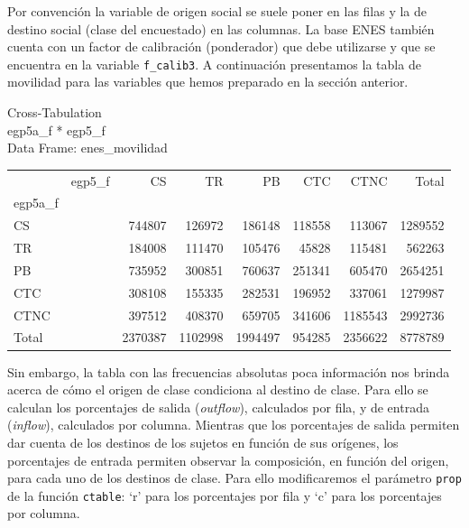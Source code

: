 \documentclass[
]{article}
\newenvironment{Shaded}{\begin{snugshade}}{\end{snugshade}}
\newcommand{\AttributeTok}[1]{\textcolor[rgb]{0.13,0.29,0.53}{#1}}
\newcommand{\FunctionTok}[1]{\textcolor[rgb]{0.13,0.29,0.53}{\textbf{#1}}}
\newcommand{\NormalTok}[1]{#1}
\newcommand{\SpecialCharTok}[1]{\textcolor[rgb]{0.81,0.36,0.00}{\textbf{#1}}}
\newcommand{\StringTok}[1]{\textcolor[rgb]{0.31,0.60,0.02}{#1}}
\begin{document}
Por convención la variable de origen social se suele poner en las filas y la de destino social (clase del encuestado) en las columnas. La base ENES también cuenta con un factor de calibración (ponderador) que debe utilizarse y que se encuentra en la variable \texttt{f\_calib3}. A continuación presentamos la tabla de movilidad para las variables que hemos preparado en la sección anterior.

\begin{Shaded}
\end{Shaded}

Cross-Tabulation\\
egp5a\_f * egp5\_f\\
Data Frame: enes\_movilidad

\begin{longtable}[]{@{}lrrrrrrr@{}}
\toprule\noalign{}
\endhead
\bottomrule\noalign{}
\endlastfoot
& egp5\_f & CS & TR & PB & CTC & CTNC & Total \\
egp5a\_f & & & & & & & \\
CS & & 744807 & 126972 & 186148 & 118558 & 113067 & 1289552 \\
TR & & 184008 & 111470 & 105476 & 45828 & 115481 & 562263 \\
PB & & 735952 & 300851 & 760637 & 251341 & 605470 & 2654251 \\
CTC & & 308108 & 155335 & 282531 & 196952 & 337061 & 1279987 \\
CTNC & & 397512 & 408370 & 659705 & 341606 & 1185543 & 2992736 \\
Total & & 2370387 & 1102998 & 1994497 & 954285 & 2356622 & 8778789 \\
\end{longtable}

Sin embargo, la tabla con las frecuencias absolutas poca información nos brinda acerca de cómo el origen de clase condiciona al destino de clase. Para ello se calculan los porcentajes de salida (\emph{outflow}), calculados por fila, y de entrada (\emph{inflow}), calculados por columna. Mientras que los porcentajes de salida permiten dar cuenta de los destinos de los sujetos en función de sus orígenes, los porcentajes de entrada permiten observar la composición, en función del origen, para cada uno de los destinos de clase. Para ello modificaremos el parámetro \texttt{prop} de la función \texttt{ctable}: `r' para los porcentajes por fila y `c' para los porcentajes por columna.
\end{document}
